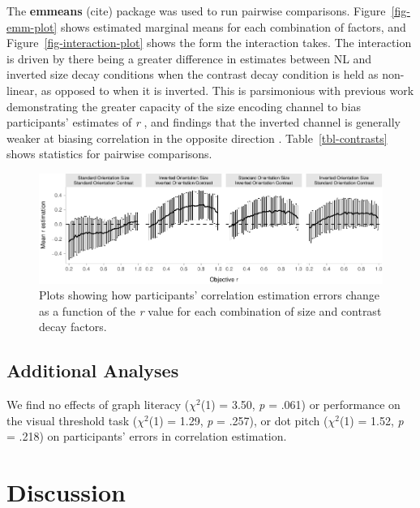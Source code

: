 \documentclass[manuscript, review, anonymous, screen]{acmart}
\begin{document}
The \textbf{emmeans} (cite) package was used to run pairwise
comparisons. Figure~\ref{fig-emm-plot} shows estimated marginal means
for each combination of factors, and Figure~\ref{fig-interaction-plot}
shows the form the interaction takes. The interaction is driven by there
being a greater difference in estimates between NL and inverted size
decay conditions when the contrast decay condition is held as
non-linear, as opposed to when it is inverted. This is parsimonious with
previous work demonstrating the greater capacity of the size encoding
channel to bias participants' estimates of \emph{r}
\citep{strain_2023b}, and findings that the inverted channel is
generally weaker at biasing correlation in the opposite direction
\citep{strain_2023, strain_2023b}. Table~\ref{tbl-contrasts} shows
statistics for pairwise comparisons.

\begin{figure}

{\centering \includegraphics[width=1\textwidth,height=\textheight]{size_and_contrast_new_files/figure-pdf/fig-diff-error-bars-plot-1.pdf}

}

\caption{\label{fig-diff-error-bars-plot}Plots showing how participants'
correlation estimation errors change as a function of the \emph{r} value
for each combination of size and contrast decay factors.}

\end{figure}

\hypertarget{sec-add-analyses}{%
\subsection{Additional Analyses}\label{sec-add-analyses}}

We find no effects of graph literacy (\(\chi^2\)(1) = 3.50, \emph{p} =
.061) or performance on the visual threshold task (\(\chi^2\)(1) = 1.29,
\emph{p} = .257), or dot pitch (\(\chi^2\)(1) = 1.52, \emph{p} = .218)
on participants' errors in correlation estimation.

\hypertarget{sec-discussion}{%
\section{Discussion}\label{sec-discussion}}
\end{document}
